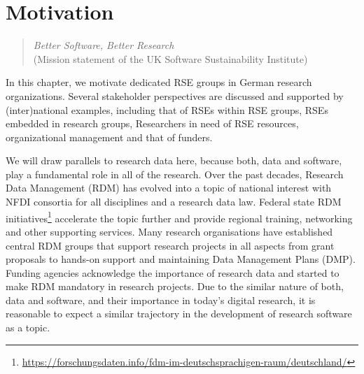 \documentclass[a4paper]{article}
\begin{document}
\section{Motivation}


\begin{quotation}
      \textit{Better Software, Better Research}\\(Mission statement of the UK Software Sustainability Institute)
\end{quotation}

In this chapter, we motivate dedicated RSE groups in German research organizations.
Several stakeholder perspectives are discussed and supported by (inter)national examples, including that of RSEs within RSE groups, RSEs embedded in research groups, Researchers in need of RSE resources, organizational management and that of funders.

We will draw parallels to research data here, because both, data and software, play a fundamental role in all of the research. Over the past decades, Research Data Management (RDM) has evolved into a topic of national interest with NFDI consortia for all disciplines and a research data law. 
Federal state RDM initiatives\footnote{\url{https://forschungsdaten.info/fdm-im-deutschsprachigen-raum/deutschland/}} accelerate the topic further and provide regional training, networking and other supporting services. 
Many research organisations have established central RDM groups that support research projects in all aspects from grant proposals to hands-on support and maintaining Data Management Plans (DMP). 
Funding agencies acknowledge the importance of research data and started to make RDM mandatory in research projects. 
Due to the similar nature of both, data and software, and their importance in today's digital research, it is reasonable to expect a similar trajectory in the development of research software as a topic.
\end{document}
